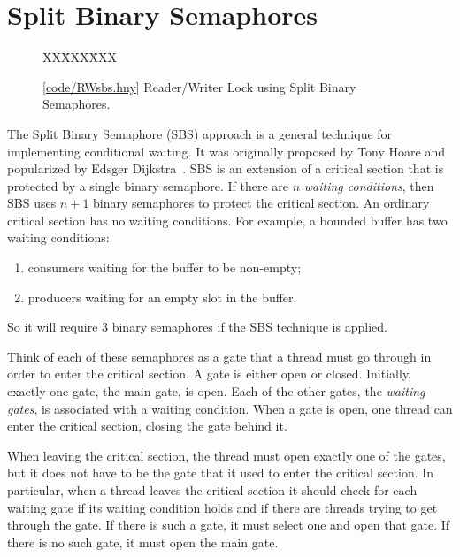 \documentclass{report}
\newcommand{\harmonysource}[1]{
\begin{tabbing}
XX\=XXX\=XXX\kill
    
\end{tabbing}
}
\newcommand{\harmonylink}[1]{%
[\href{https://harmony.cs.cornell.edu/#1}{\underline{#1}}]%
}
\newenvironment{code}{
\tcolorbox
}{
\endtcolorbox
}
\begin{document}
\chapter{Split Binary Semaphores}
\label{ch:sbs}
%

\begin{figure}
\begin{code}
\harmonysource{RWsbs}
\end{code}
\caption{\harmonylink{code/RWsbs.hny} Reader/Writer Lock using Split Binary Semaphores.}
\label{fig:RWsplitsema}
\end{figure}

%

The Split Binary Semaphore (SBS) approach is a general technique for
implementing conditional waiting.  It was originally proposed by
Tony Hoare and popularized by Edsger Dijkstra~\cite{EWD703}.
SBS is an extension of a critical section that is protected by a single
binary semaphore.
If there are $n$ \emph{waiting conditions},
then SBS uses $n+1$ binary semaphores to protect the critical section.
An ordinary critical section has no waiting conditions.
For example, a bounded buffer has two waiting conditions:
\begin{enumerate}
\item consumers waiting for the buffer to be non-empty;
\item producers waiting for an empty slot in the buffer.
\end{enumerate}
So it will require 3 binary semaphores if the SBS technique is applied.

Think of each of these semaphores as a gate that a thread must go
through in order to enter the critical section.  A gate is either open
or closed.  Initially, exactly one gate, the main gate, is open.
Each of the other gates, the \emph{waiting gates}, is associated with a
waiting condition.
When a gate is open, one thread can enter the critical section,
closing the gate behind it.

When leaving the critical section, the thread must open exactly one
of the gates, but it does not have to be the gate that it used to enter
the critical section.
In particular, when a thread leaves the critical section it should
check for each waiting gate if its waiting condition holds and if there are
threads trying to get through the gate.  If there is such a gate,
it must select one and open that gate.  If there is no such gate,
it must open the main gate.
\end{document}

